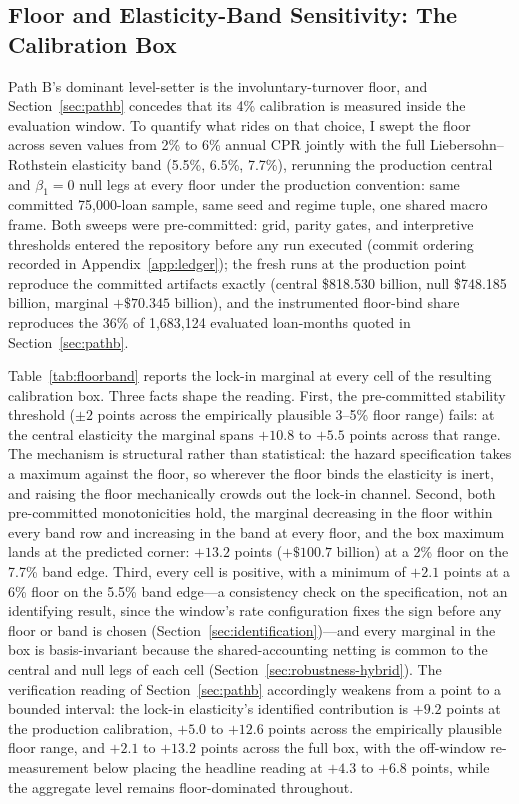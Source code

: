 \documentclass[12pt]{article}
\begin{document}
\subsection{Floor and Elasticity-Band Sensitivity: The Calibration Box}\label{sec:robustness-floor}

Path B's dominant level-setter is the involuntary-turnover floor, and Section~\ref{sec:pathb} concedes that its 4\% calibration is measured inside the evaluation window. To quantify what rides on that choice, I swept the floor across seven values from 2\% to 6\% annual CPR jointly with the full Liebersohn--Rothstein elasticity band (5.5\%, 6.5\%, 7.7\%), rerunning the production central and $\beta_1 = 0$ null legs at every floor under the production convention: same committed 75,000-loan sample, same seed and regime tuple, one shared macro frame. Both sweeps were pre-committed: grid, parity gates, and interpretive thresholds entered the repository before any run executed (commit ordering recorded in Appendix~\ref{app:ledger}); the fresh runs at the production point reproduce the committed artifacts exactly (central \$818.530 billion, null \$748.185 billion, marginal $+\$70.345$ billion), and the instrumented floor-bind share reproduces the 36\% of 1,683,124 evaluated loan-months quoted in Section~\ref{sec:pathb}.

Table~\ref{tab:floorband} reports the lock-in marginal at every cell of the resulting calibration box. Three facts shape the reading. First, the pre-committed stability threshold ($\pm 2$ points across the empirically plausible 3--5\% floor range) fails: at the central elasticity the marginal spans $+10.8$ to $+5.5$ points across that range. The mechanism is structural rather than statistical: the hazard specification takes a maximum against the floor, so wherever the floor binds the elasticity is inert, and raising the floor mechanically crowds out the lock-in channel. Second, both pre-committed monotonicities hold, the marginal decreasing in the floor within every band row and increasing in the band at every floor, and the box maximum lands at the predicted corner: $+13.2$ points ($+\$100.7$ billion) at a 2\% floor on the 7.7\% band edge. Third, every cell is positive, with a minimum of $+2.1$ points at a 6\% floor on the 5.5\% band edge---a consistency check on the specification, not an identifying result, since the window's rate configuration fixes the sign before any floor or band is chosen (Section~\ref{sec:identification})---and every marginal in the box is basis-invariant because the shared-accounting netting is common to the central and null legs of each cell (Section~\ref{sec:robustness-hybrid}). The verification reading of Section~\ref{sec:pathb} accordingly weakens from a point to a bounded interval: the lock-in elasticity's identified contribution is $+9.2$ points at the production calibration, $+5.0$ to $+12.6$ points across the empirically plausible floor range, and $+2.1$ to $+13.2$ points across the full box, with the off-window re-measurement below placing the headline reading at $+4.3$ to $+6.8$ points, while the aggregate level remains floor-dominated throughout.
\end{document}
